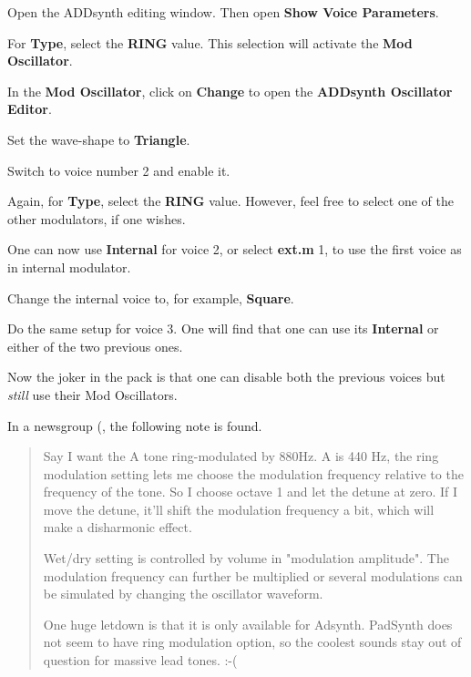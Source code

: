    \begin{enumber}
      \item Open the ADDsynth editing window.  Then open
         \textbf{Show Voice Parameters}.
      \item For \textbf{Type}, select the \textbf{RING} value.  This
         selection will activate the \textbf{Mod Oscillator}.
      \item In the \textbf{Mod Oscillator}, click on \textbf{Change} to open
         the \textbf{ADDsynth Oscillator Editor}.
      \item Set the wave-shape to \textbf{Triangle}.
      \item Switch to voice number 2 and enable it.
      \item Again, for \textbf{Type}, select the \textbf{RING} value.
         However, feel free to select one of the other modulators, if one
         wishes.
      \item One can now use \textbf{Internal} for voice 2, or select
         \textbf{ext.m} 1, to use the first voice as in internal modulator.
      \item Change the internal voice to, for example, \textbf{Square}.
      \item Do the same setup for voice 3.
         One will find that one can use its \textbf{Internal} or
         either of the two previous ones.
   \end{enumber}

   Now the joker in the pack is that one can disable both the previous
   voices but \textsl{still} use their Mod Oscillators.

   In a newsgroup (\cite{ringmodulator}, the following note is found.

   \begin{quotation}
      Say I want the A tone ring-modulated by 880Hz. A is 440 Hz, the ring
      modulation setting lets me choose the modulation frequency relative
      to the frequency of the tone. So I choose octave 1 and let the
      detune at zero. If I move the detune, it'll shift the modulation
      frequency a bit, which will make a disharmonic effect.

      Wet/dry setting is controlled by volume in "modulation amplitude".
      The modulation frequency can further be multiplied or several
      modulations can be simulated by changing the oscillator waveform.

      One huge letdown is that it is only available for Adsynth. PadSynth
      does not seem to have ring modulation option, so the coolest sounds
      stay out of question for massive lead tones. :-(
   \end{quotation}


